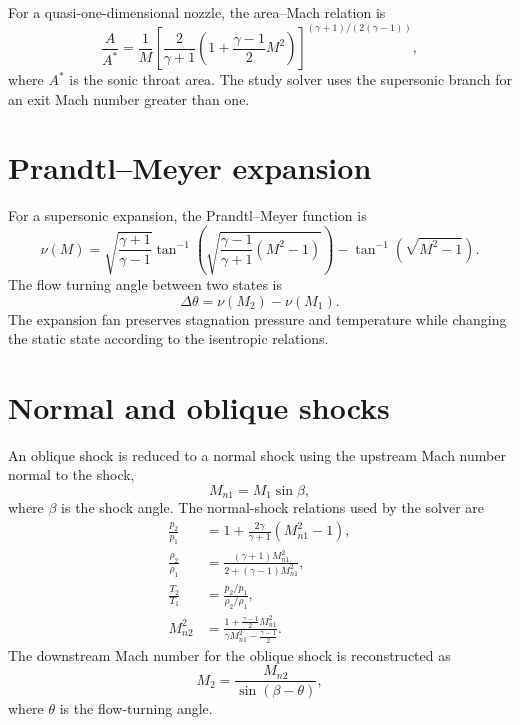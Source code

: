 \documentclass[11pt]{article}
\newcommand{\Mach}{\mathit{M}}
\newcommand{\gammaa}{\gamma}
\begin{document}
For a quasi-one-dimensional nozzle, the area--Mach relation is
\begin{equation}
  \frac{A}{A^*} = \frac{1}{\Mach}
  \left[\frac{2}{\gammaa+1}
  \left(1+\frac{\gammaa-1}{2}\Mach^2\right)\right]^{{(\gammaa+1)}/{(2(\gammaa-1))}},
\end{equation}
where \(A^*\) is the sonic throat area.  The study solver uses the
supersonic branch for an exit Mach number greater than one.

\section{Prandtl--Meyer expansion}

For a supersonic expansion, the Prandtl--Meyer function is
\begin{equation}
  \nu(\Mach) =
  \sqrt{\frac{\gammaa+1}{\gammaa-1}}
  \tan^{-1}\!\left(\sqrt{\frac{\gammaa-1}{\gammaa+1}(\Mach^2-1)}\right)
  - \tan^{-1}\!\left(\sqrt{\Mach^2-1}\right).
\end{equation}
The flow turning angle between two states is
\begin{equation}
  \Delta\theta = \nu(\Mach_2)-\nu(\Mach_1).
\end{equation}
The expansion fan preserves stagnation pressure and temperature while changing
the static state according to the isentropic relations.

\section{Normal and oblique shocks}

An oblique shock is reduced to a normal shock using the upstream Mach number
normal to the shock,
\begin{equation}
  \Mach_{n1} = \Mach_1\sin\beta,
\end{equation}
where \(\beta\) is the shock angle.  The normal-shock relations used by the
solver are
\begin{align}
  \frac{p_2}{p_1} &= 1 + \frac{2\gammaa}{\gammaa+1}(\Mach_{n1}^2-1), \\
  \frac{\rho_2}{\rho_1} &=
    \frac{(\gammaa+1)\Mach_{n1}^2}
         {2+(\gammaa-1)\Mach_{n1}^2}, \\
  \frac{T_2}{T_1} &= \frac{p_2/p_1}{\rho_2/\rho_1}, \\
  \Mach_{n2}^2 &=
    \frac{1+\frac{\gammaa-1}{2}\Mach_{n1}^2}
         {\gammaa\Mach_{n1}^2-\frac{\gammaa-1}{2}}.
\end{align}
The downstream Mach number for the oblique shock is reconstructed as
\begin{equation}
  \Mach_2 = \frac{\Mach_{n2}}{\sin(\beta-\theta)},
\end{equation}
where \(\theta\) is the flow-turning angle.
\end{document}
